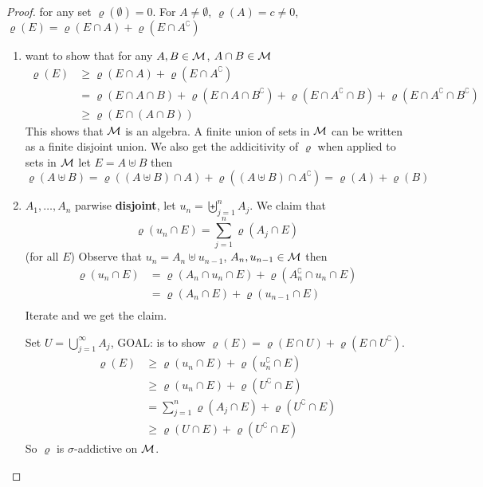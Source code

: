 \begin{proof}
  for any set $\varrho(\emptyset) = 0$. For $A \neq \emptyset$, $\varrho(A) = c \neq 0$,
  $\varrho(E) = \varrho(E \cap A) + \varrho(E\cap A^\complement)$
  \begin{enumerate}
    \item want to show that for any $A, B \in \mathcal M$, $A \cap B \in \mathcal M$
      \begin{align*}
        \varrho(E) &\ge \varrho(E \cap A) + \varrho(E \cap A^\complement) \\
        &= \varrho(E\cap A\cap B) + \varrho(E \cap A \cap B^\complement) + 
          \varrho(E \cap A^\complement \cap B) + \varrho(E \cap A^\complement \cap B^\complement) \\
        &\ge \varrho(E \cap (A \cap B)) 
      \end{align*}
      This shows that $\mathcal M$ is an algebra.
      A finite union of sets in $\mathcal M$ can be written as a finite disjoint union.
      We also get the addicitivity of $\varrho$ when applied to sets in $\mathcal M$
      let $E = A \uplus B$ then 
      \[\varrho(A \uplus B) = \varrho((A \uplus B) \cap A) + \varrho((A \uplus B) \cap A^\complement) = \varrho(A) + \varrho(B)\]
    \item $A_1, \dotsc, A_n$ parwise \textbf{disjoint}, let $u_n = \biguplus_{j=1}^n A_j$. 
      We claim that $$\varrho(u_n \cap E) = \sum_{j=1}^n \varrho(A_j \cap E)$$ (for all $E$)
      Observe that $u_n = A_n \uplus u_{n-1}$, $A_n, u_{n-1} \in \mathcal M$ then
      \begin{align*}
        \varrho(u_n \cap E) &= \varrho(A_n \cap u_n \cap E) + \varrho(A_n^\complement \cap u_n \cap E) \\
        &= \varrho(A_n \cap E) + \varrho(u_{n-1} \cap E) \\
      \end{align*}
      Iterate and we get the claim.

      Set $U = \bigcup_{j=1}^\infty A_j$, GOAL: is to show $\varrho(E) = \varrho(E \cap U) + \varrho(E \cap U^\complement)$.
      \begin{align*}
        \varrho(E) &\ge \varrho(u_n \cap E) + \varrho(u_n^\complement \cap E) \\
        &\ge \varrho(u_n \cap E) + \varrho(U^\complement \cap E) \\
        &= \sum_{j=1}^n\varrho(A_j \cap E) + \varrho(U^\complement \cap E) \\
        &\ge \varrho(U \cap E) + \varrho(U^\complement \cap E)
      \end{align*}
      So $\varrho$ is $\sigma$-addictive on $\mathcal M$.
  \end{enumerate} 
\end{proof}

